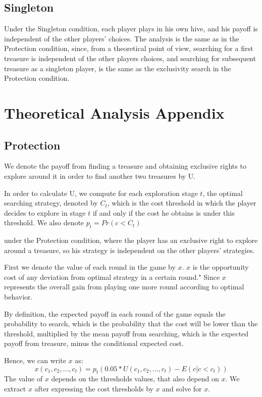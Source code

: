 \subsection{Singleton}
Under the Singleton condition, each player plays in his own hive, and his payoff is independent of the other players' choices. The analysis is the same as in the Protection condition, since, from a theoretical point of view, searching for a first treasure is independent of the other players choices, and searching for subsequent treasure as a singleton player, is the same as the exclusivity search in the Protection condition.


\section{Theoretical Analysis Appendix}

\subsection{Protection}\label{apdx:patent}
We denote the payoff from finding a treasure and obtaining exclusive rights to explore around it in order to find another two treasures by U. 

In order to calculate U, we compute for each exploration stage $t$, the optimal searching strategy, denoted by $C_t$, which is the cost threshold in which the player decides to explore in stage $t$ if and only if the cost he obtains is under this threshold. We also denote $p_t=Pr(c<C_t)$ 

under the Protection condition, where the player has an exclusive right to explore around a treasure, so his strategy is independent on the other players' strategies.

First we denote the value of each round in the game by $x$. $x$ is the opportunity cost of any deviation from optimal strategy in a certain round."
Since $x$ represents the overall gain from playing one more round according to optimal behavior.
 

By definition, the expected payoff in each round of the game equals the probability to search, which is the probability that the cost will be lower than the threshold, multiplied by the mean payoff from searching, which is the expected payoff from treasure, minus the conditional expected cost. 

Hence, we can write $x$ as: $$x(c_1,c_2,...,c_t)=p_t(0.05*U(c_1,c_2,...,c_t)-E(c|c<c_t))$$
The value of $x$ depends on the thresholds values, that also depend on $x$. We extract $x$ after expressing the cost thresholds by $x$ and solve for $x$. 

